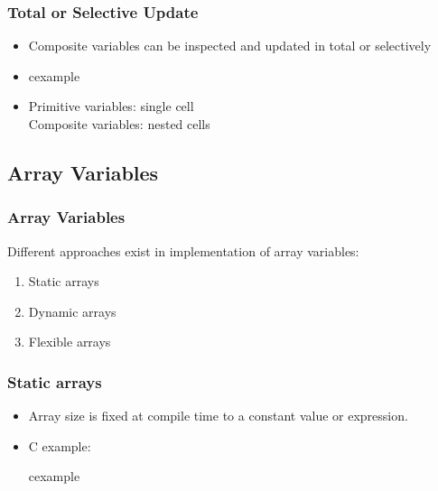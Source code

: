
\begin{frame}
 \frametitle{Total or Selective Update}
\begin{itemize}
 \item Composite variables can be inspected and updated in total or selectively
 \item
\begin{beamercolorbox}{cexample}
 \codeupdateC
\end{beamercolorbox}
\item Primitive variables: single cell\\
	Composite variables: nested cells
\end{itemize}
\end{frame}

\subsection{Array Variables}
\begin{frame}
\frametitle{Array Variables}
Different approaches exist in implementation of array variables:
\begin{enumerate}
 \item Static arrays
 \item Dynamic arrays
 \item Flexible arrays
\end{enumerate}
\end{frame}

\begin{frame}
\frametitle{Static arrays}
\begin{itemize}
\item Array size is fixed at compile time to a constant value or expression.
\item C example:
\begin{beamercolorbox}{cexample}
\codedizstatC
\end{beamercolorbox}
\end{itemize}
\end{frame}

